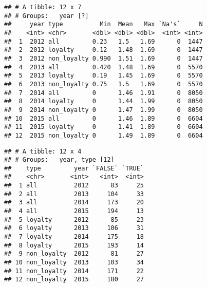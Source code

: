 \documentclass[]{article}
\newenvironment{Shaded}{\begin{snugshade}}{\end{snugshade}}
\newcommand{\KeywordTok}[1]{\textcolor[rgb]{0.13,0.29,0.53}{\textbf{#1}}}
\newcommand{\DataTypeTok}[1]{\textcolor[rgb]{0.13,0.29,0.53}{#1}}
\newcommand{\DecValTok}[1]{\textcolor[rgb]{0.00,0.00,0.81}{#1}}
\newcommand{\StringTok}[1]{\textcolor[rgb]{0.31,0.60,0.02}{#1}}
\newcommand{\OperatorTok}[1]{\textcolor[rgb]{0.81,0.36,0.00}{\textbf{#1}}}
\newcommand{\NormalTok}[1]{#1}
\begin{document}
\begin{verbatim}
## # A tibble: 12 x 7
## # Groups:   year [?]
##     year type          Min  Mean   Max `Na's`     N
##    <int> <chr>       <dbl> <dbl> <dbl>  <int> <int>
##  1  2012 all         0.23   1.5   1.69      0  1447
##  2  2012 loyalty     0.12   1.48  1.69      0  1447
##  3  2012 non_loyalty 0.990  1.51  1.69      0  1447
##  4  2013 all         0.420  1.48  1.69      0  5570
##  5  2013 loyalty     0.19   1.45  1.69      0  5570
##  6  2013 non_loyalty 0.75   1.5   1.69      0  5570
##  7  2014 all         0      1.46  1.91      0  8050
##  8  2014 loyalty     0      1.44  1.99      0  8050
##  9  2014 non_loyalty 0      1.47  1.99      0  8050
## 10  2015 all         0      1.46  1.89      0  6604
## 11  2015 loyalty     0      1.41  1.89      0  6604
## 12  2015 non_loyalty 0      1.49  1.89      0  6604
\end{verbatim}

\begin{Shaded}
\end{Shaded}

\begin{verbatim}
## # A tibble: 12 x 4
## # Groups:   year, type [12]
##    type         year `FALSE` `TRUE`
##    <chr>       <int>   <int>  <int>
##  1 all          2012      83     25
##  2 all          2013     104     33
##  3 all          2014     173     20
##  4 all          2015     194     13
##  5 loyalty      2012      85     23
##  6 loyalty      2013     106     31
##  7 loyalty      2014     175     18
##  8 loyalty      2015     193     14
##  9 non_loyalty  2012      81     27
## 10 non_loyalty  2013     103     34
## 11 non_loyalty  2014     171     22
## 12 non_loyalty  2015     180     27
\end{verbatim}
\end{document}
